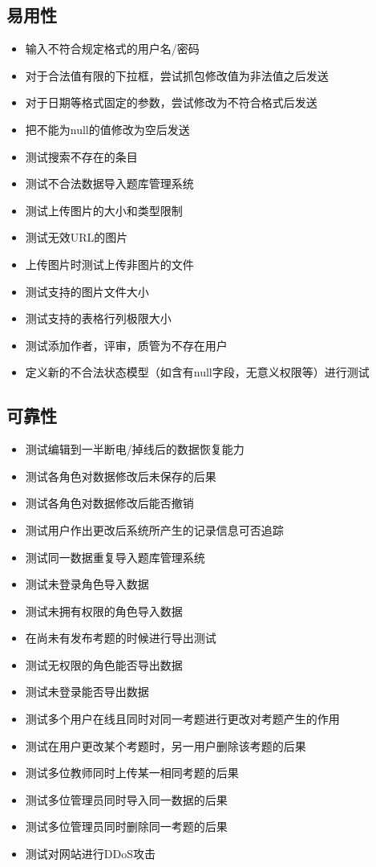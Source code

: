 \documentclass[hyperref, a4paper]{ctexart}
\providecommand{\tightlist}{%
  \setlength{\itemsep}{0pt}\setlength{\parskip}{0pt}}
\begin{document}
\hypertarget{ux6613ux7528ux6027}{%
\subsection{易用性}\label{ux6613ux7528ux6027}}

\begin{itemize}
\tightlist
\item
  输入不符合规定格式的用户名/密码
\item
  对于合法值有限的下拉框，尝试抓包修改值为非法值之后发送
\item
  对于日期等格式固定的参数，尝试修改为不符合格式后发送
\item
  把不能为null的值修改为空后发送
\item
  测试搜索不存在的条目
\item
  测试不合法数据导入题库管理系统
\item
  测试上传图片的大小和类型限制
\item
  测试无效URL的图片
\item
  上传图片时测试上传非图片的文件
\item
  测试支持的图片文件大小
\item
  测试支持的表格行列极限大小
\item
  测试添加作者，评审，质管为不存在用户
\item
  定义新的不合法状态模型（如含有null字段，无意义权限等）进行测试
\end{itemize}

\hypertarget{ux53efux9760ux6027}{%
\subsection{可靠性}\label{ux53efux9760ux6027}}

\begin{itemize}
\tightlist
\item
  测试编辑到一半断电/掉线后的数据恢复能力
\item
  测试各角色对数据修改后未保存的后果
\item
  测试各角色对数据修改后能否撤销
\item
  测试用户作出更改后系统所产生的记录信息可否追踪
\item
  测试同一数据重复导入题库管理系统
\item
  测试未登录角色导入数据
\item
  测试未拥有权限的角色导入数据
\item
  在尚未有发布考题的时候进行导出测试
\item
  测试无权限的角色能否导出数据
\item
  测试未登录能否导出数据
\item
  测试多个用户在线且同时对同一考题进行更改对考题产生的作用
\item
  测试在用户更改某个考题时，另一用户删除该考题的后果
\item
  测试多位教师同时上传某一相同考题的后果
\item
  测试多位管理员同时导入同一数据的后果
\item
  测试多位管理员同时删除同一考题的后果
\item
  测试对网站进行DDoS攻击
\end{itemize}
\end{document}
